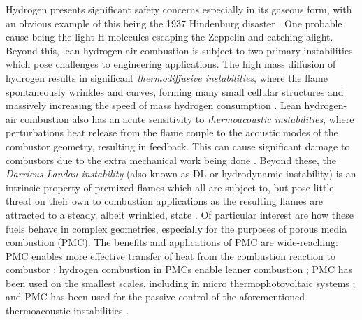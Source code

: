 Hydrogen presents significant safety concerns \cite{green2006HydrogenSafetyIssues} especially in its gaseous form, with an obvious example of this being the 1937 Hindenburg disaster \cite{dilisi2017HindenburgDisasterCombining}. One probable cause being the light H molecules escaping the Zeppelin and catching alight. Beyond this, lean hydrogen-air combustion is subject to two primary instabilities which pose challenges to engineering applications. The high mass diffusion of hydrogen results in significant \emph{thermodiffusive instabilities}, where the flame spontaneously wrinkles and curves, forming many small cellular structures \cite{sivashinsky1983InstabilitiesPatternFormation} and massively increasing the speed of mass hydrogen consumption \cite{howarth2023ThermodiffusivelyUnstableLeanPremixed}. Lean hydrogen-air combustion also has an acute sensitivity to \emph{thermoacoustic instabilities}, where perturbations heat release from the flame couple to the acoustic modes of the combustor geometry, resulting in feedback. This can cause significant damage to combustors due to the extra mechanical work being done \cite{morgans2024ThermoacousticInstabilityCombustors}. Beyond these, the \emph{Darrieus-Landau instability} (also known as DL or hydrodynamic instability) is an intrinsic property of premixed flames which all are subject to, but pose little threat on their own to combustion applications as the resulting flames are attracted to a steady. albeit wrinkled, state \cite{matalon2018DarrieusLandauInstability}. Of particular interest are how these fuels behave in complex geometries, especially for the purposes of porous media combustion (PMC). The benefits and applications of PMC are wide-reaching: PMC enables more effective transfer of heat from the combustion reaction to combustor \cite{mujeebu2009CombustionPorousMedia}; hydrogen combustion in PMCs enable leaner combustion \cite{tseng2002EffectsHydrogenAddition}; PMC has been used on the smallest scales, including in micro thermophotovoltaic systems \cite{pan2015HydrogenOxygenPremixed}; and PMC has been used for the passive control of the aforementioned thermoacoustic instabilities \cite{meadows2015PorousInsertsPassive, dowd2018ThermoacousticInstabilityModel}.

